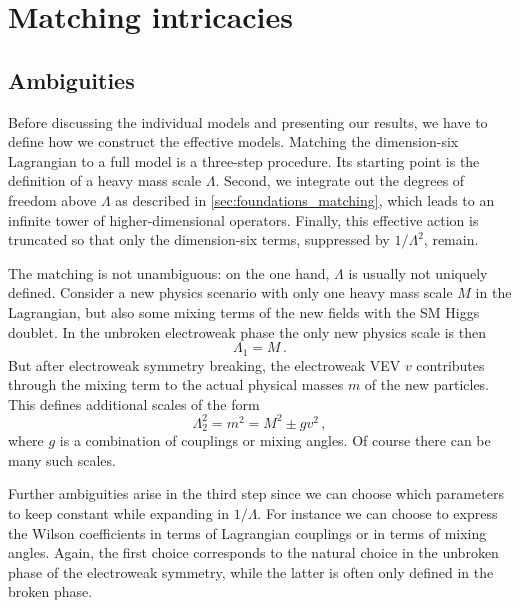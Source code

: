 \section{Matching intricacies}
\label{sec:validity_matching}

\subsection{Ambiguities}
\label{sec:validity_matching_ambiguities}

Before discussing the individual models and presenting our results, we
have to define how we construct the effective models.  Matching the
dimension-six Lagrangian to a full model is a three-step procedure.
Its starting point is the definition of a heavy mass scale $\Lambda$.
Second, we integrate out the degrees of freedom above $\Lambda$ as
described in \autoref{sec:foundations_matching}, which leads to an
infinite tower of higher-dimensional operators.  Finally, this
effective action is truncated so that only the dimension-six terms,
suppressed by $1 / \Lambda^2$, remain.

The matching is not unambiguous: on the one hand, $\Lambda$ is usually
not uniquely defined. Consider a new physics scenario with only one
heavy mass scale $M$ in the Lagrangian, but also some mixing terms of
the new fields with the SM Higgs doublet. In the unbroken electroweak
phase the only new physics scale is then
%
\begin{equation}
  \Lambda_1 = M \,.
\end{equation}
%
But after electroweak symmetry breaking, the electroweak VEV $v$
contributes through the mixing term to the actual physical masses $m$
of the new particles. This defines additional scales of the form
%
\begin{equation}
  \Lambda_2^2 = m^2 = M^2 \pm g v^2 \,,
\end{equation}
%
where $g$ is a combination of couplings or mixing angles. Of course
there can be many such scales.

Further ambiguities arise in the third step since we can choose which
parameters to keep constant while expanding in $1/\Lambda$. For
instance we can choose to express the Wilson coefficients in terms of
Lagrangian couplings or in terms of mixing angles. Again, the first
choice corresponds to the natural choice in the unbroken phase of the
electroweak symmetry, while the latter is often only defined in the
broken phase.

